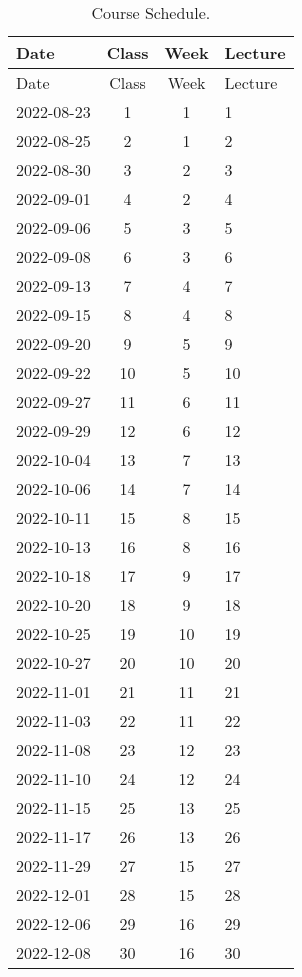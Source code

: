 \documentclass[11pt,]{article}
\begin{document}
\newpage

\renewcommand{\arraystretch}{1.25}

\begin{longtable}[]{@{}lccl@{}}
\caption{Course Schedule.}\tabularnewline
\toprule
Date & Class & Week & Lecture \\
\midrule
\endfirsthead
\toprule
Date & Class & Week & Lecture \\
\midrule
\endhead
2022-08-23 & 1 & 1 & 1 \\
2022-08-25 & 2 & 1 & 2 \\
2022-08-30 & 3 & 2 & 3 \\
2022-09-01 & 4 & 2 & 4 \\
2022-09-06 & 5 & 3 & 5 \\
2022-09-08 & 6 & 3 & 6 \\
2022-09-13 & 7 & 4 & 7 \\
2022-09-15 & 8 & 4 & 8 \\
2022-09-20 & 9 & 5 & 9 \\
2022-09-22 & 10 & 5 & 10 \\
2022-09-27 & 11 & 6 & 11 \\
2022-09-29 & 12 & 6 & 12 \\
2022-10-04 & 13 & 7 & 13 \\
2022-10-06 & 14 & 7 & 14 \\
2022-10-11 & 15 & 8 & 15 \\
2022-10-13 & 16 & 8 & 16 \\
2022-10-18 & 17 & 9 & 17 \\
2022-10-20 & 18 & 9 & 18 \\
2022-10-25 & 19 & 10 & 19 \\
2022-10-27 & 20 & 10 & 20 \\
2022-11-01 & 21 & 11 & 21 \\
2022-11-03 & 22 & 11 & 22 \\
2022-11-08 & 23 & 12 & 23 \\
2022-11-10 & 24 & 12 & 24 \\
2022-11-15 & 25 & 13 & 25 \\
2022-11-17 & 26 & 13 & 26 \\
2022-11-29 & 27 & 15 & 27 \\
2022-12-01 & 28 & 15 & 28 \\
2022-12-06 & 29 & 16 & 29 \\
2022-12-08 & 30 & 16 & 30 \\
\bottomrule
\end{longtable}
\end{document}

